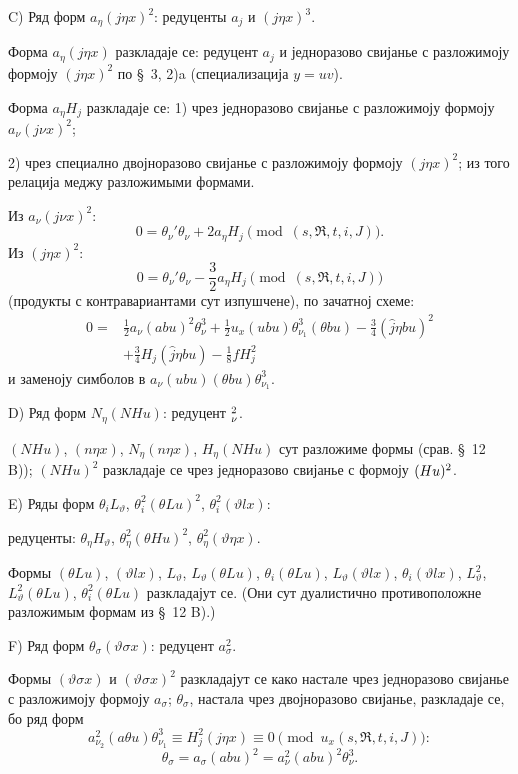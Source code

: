 ﻿\documentclass[11pt]{article}
\let\A\relax
\newcommand{\A}{\mathfrak A}
\newcommand{\R}{\mathfrak R}
\begin{document}
\noindent\mbox{C)} Ряд форм $a_\eta(j\eta x)^2$: редуценты $a_j$ и $(j\eta x)^3$.

Форма $a_\eta(j\eta x)$ разкладаје се: редуцент $a_j$ и једноразово свијанье с разложимоју формоју $(j\eta x)^2$ по \S\ 3, 2)\mbox{a} (специализација $y=uv$).

Форма $a_\eta H_j$ разкладаје се: 1) чрез једноразово свијанье с разложимоју формоју $a_\nu(j\nu x)^2$;

2) чрез специално двојноразово свијанье с разложимоју формоју $(j\eta x)^2$; из того релација меджу разложимыми формами.

Из $a_\nu(j\nu x)^2$:
\[
0=\theta_\nu'\theta_\nu+2a_\eta H_j\pmod{(s,\R,t,i,J)}.
\]
Из $(j\eta x)^2$:
\[
0=\theta_\nu'\theta_\nu-\frac32a_\eta H_j\pmod{(s,\R,t,i,J)}
\]
(продукты с контравариантами сут изпушчене), по зачатној схеме:
\[
\begin{aligned}
0={}&\frac12a_\nu(abu)^2\theta_\nu^3
+\frac12u_x(ubu)\theta_{\nu_1}^3(\theta bu)
-\frac34(\widehat{j}\eta bu)^2\\
&+\frac34H_j(\widehat{j}\eta bu)-\frac18fH_j^2
\end{aligned}
\]
и заменоју симболов в $a_\nu(ubu)(\theta bu)\theta_{\nu_1}^3$.

\noindent\mbox{D)} Ряд форм $N_\eta(NHu)$: редуцент $\A_\nu^2$.

$(NHu)$, $(n\eta x)$, $N_\eta(n\eta x)$, $H_\eta(NHu)$ сут разложиме формы (срав. \S\ 12 \mbox{B)}); $(NHu)^2$ разкладаје се чрез једноразово свијанье с формоју $(\A Hu)^2$.

\noindent\mbox{E)} Ряды форм $\theta_iL_\vartheta$, $\theta_i^2(\theta Lu)^2$, $\theta_i^2(\vartheta lx)$:

редуценты: $\theta_\eta H_\vartheta$, $\theta_\eta^2(\theta Hu)^2$, $\theta_\eta^2(\vartheta\eta x)$.

Формы $(\theta Lu)$, $(\vartheta lx)$, $L_\vartheta$, $L_\vartheta(\theta Lu)$, $\theta_i(\theta Lu)$, $L_\vartheta(\vartheta lx)$, $\theta_i(\vartheta lx)$, $L_\vartheta^2$, $L_\vartheta^2(\theta Lu)$, $\theta_i^2(\theta Lu)$ разкладајут се. (Они сут дуалистично противоположне разложимым формам из \S\ 12 \mbox{B)}.)

\noindent\mbox{F)} Ряд форм $\theta_\sigma(\vartheta\sigma x)$: редуцент $a_\sigma^2$.

Формы $(\vartheta\sigma x)$ и $(\vartheta\sigma x)^2$ разкладајут се како настале чрез једноразово свијанье с разложимоју формоју $a_\sigma$; $\theta_\sigma$, настала чрез двојноразово свијанье, разкладаје се, бо ряд форм
\[
a_{\nu_2}^2(a\theta u)\theta_{\nu_1}^3\equiv H_j^2(j\eta x)\equiv0\pmod{u_x(s,\R,t,i,J)}:
\]
\[
\theta_\sigma=a_\sigma(abu)^2=a_\nu^2(abu)^2\theta_\nu^3.
\]
\end{document}
